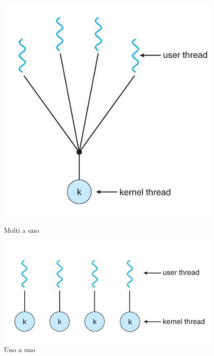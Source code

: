 \documentclass{article}
\begin{document}
\begin{figure}[h]
    \begin{minipage}{0.5\textwidth}
    \centering
    \includegraphics[width=0.7\linewidth]{im/1m}
    \caption{Molti a uno}    
    \end{minipage}
    \begin{minipage}{0.5\textwidth}
    \centering
    \includegraphics[width=0.7\linewidth]{im/2m}
    \caption{Uno a uno}    
    \end{minipage}
    \end{figure}
\end{document}
